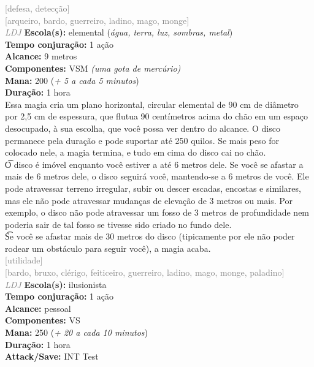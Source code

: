 \documentclass{RPG_Adventure}[2021/10/20]
\begin{document}
{\scriptsize \textcolor{gray}{[defesa, detecção]\\}}
{\scriptsize \textcolor{gray}{[arqueiro, bardo, guerreiro, ladino, mago, monge]\\}}
{\tiny \textcolor{gray}{\textit{LDJ}}}\jump{}
{\small \t \textbf{Escola(s):} elemental (\textit{água, terra, luz, sombras, metal})\\\t \textbf{Tempo conjuração:} 1 ação\\\t \textbf{Alcance:} 9 metros\\\t \textbf{Componentes:} VSM \textit{(uma gota de mercúrio)}\\\t \textbf{Mana:} 200 (\textit{+ 5 a cada 5 minutos})\\\t \textbf{Duração:} 1 hora\\}
{\normalsize Essa magia cria um plano horizontal, circular elemental de 90 cm de diâmetro por 2,5 cm de espessura, que flutua 90 centímetros acima do chão em um espaço desocupado, à sua escolha, que você possa ver dentro do alcance. O disco permanece pela duração e pode suportar até 250 quilos. Se mais peso for colocado nele, a magia termina, e tudo em cima do disco cai no chão.\\\t O disco é imóvel enquanto você estiver a até 6 metros dele. Se você se afastar a mais de 6 metros dele, o disco seguirá você, mantendo-se a 6 metros de você. Ele pode atravessar terreno irregular, subir ou descer escadas, encostas e similares, mas ele não pode atravessar mudanças de elevação de 3 metros ou mais. Por exemplo, o disco não pode atravessar um fosso de 3 metros de profundidade nem poderia sair de tal fosso se tivesse sido criado no fundo dele.\\\t Se você se afastar mais de 30 metros do disco (tipicamente por ele não poder rodear um obstáculo para seguir você), a magia acaba.\\}
{\scriptsize \textcolor{gray}{[utilidade]\\}}
{\scriptsize \textcolor{gray}{[bardo, bruxo, clérigo, feiticeiro, guerreiro, ladino, mago, monge, paladino]\\}}
{\tiny \textcolor{gray}{\textit{LDJ}}}\jump{}
{\small \t \textbf{Escola(s):} ilusionista\\\t \textbf{Tempo conjuração:} 1 ação\\\t \textbf{Alcance:} pessoal\\\t \textbf{Componentes:} VS\\\t \textbf{Mana:} 250 (\textit{+ 20 a cada 10 minutos})\\\t \textbf{Duração:} 1 hora\\\t \textbf{Attack/Save:} INT Test\\}
\end{document}
